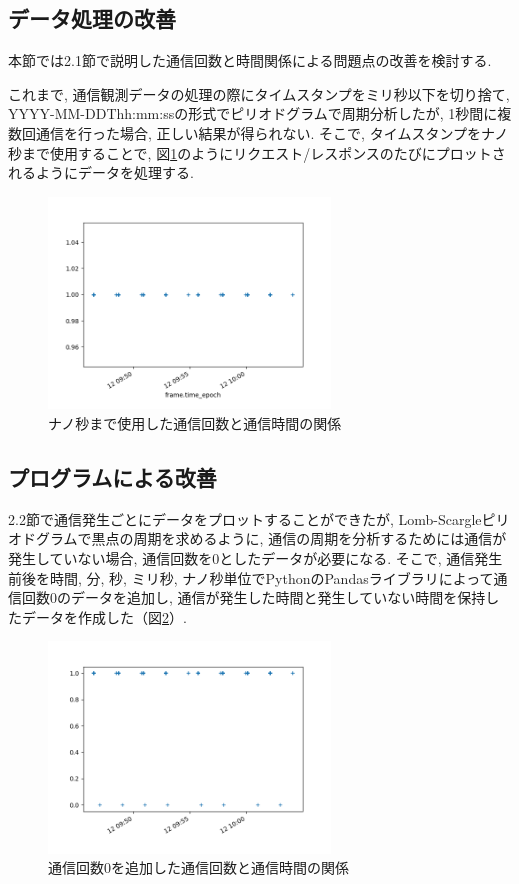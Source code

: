 \documentclass[twocolumn,10pt]{ltjsarticle}
\begin{document}
\subsection{データ処理の改善}
本節では2.1節で説明した通信回数と時間関係による問題点の改善を検討する. 

これまで, 通信観測データの処理の際にタイムスタンプをミリ秒以下を切り捨て, YYYY-MM-DDThh:mm:ssの形式でピリオドグラムで周期分析したが, 1秒間に複数回通信を行った場合, 正しい結果が得られない. そこで, タイムスタンプをナノ秒まで使用することで, 図\ref{fig:e12_count}のようにリクエスト/レスポンスのたびにプロットされるようにデータを処理する. 

\begin{figure}[htbp]
    \centering

    \includegraphics[width=7.5cm]{images/【実験】通信時間の粒度を高めたデータでの周期分析結果/e12_count.png}

    \caption{ナノ秒まで使用した通信回数と通信時間の関係}
    \label{fig:e12_count}
\end{figure}

\subsection{プログラムによる改善}
2.2節で通信発生ごとにデータをプロットすることができたが, Lomb-Scargleピリオドグラムで黒点の周期を求めるように, 通信の周期を分析するためには通信が発生していない場合, 通信回数を0としたデータが必要になる. そこで, 通信発生前後を時間, 分, 秒, ミリ秒, ナノ秒単位でPythonのPandasライブラリによって通信回数0のデータを追加し, 通信が発生した時間と発生していない時間を保持したデータを作成した（図\ref{fig:e12_program}）. 

\begin{figure}[htbp]
    \centering

    \includegraphics[width=7.5cm]{images/【実験】通信時間の粒度を高めたデータでの周期分析結果/e12_program.png}

    \caption{通信回数0を追加した通信回数と通信時間の関係}
    \label{fig:e12_program}
\end{figure}
\end{document}
